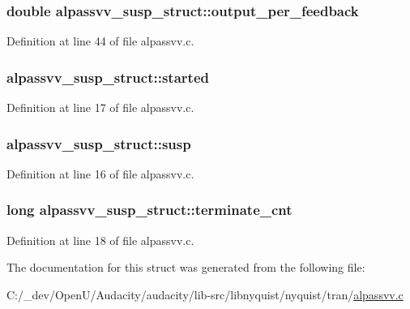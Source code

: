\subsubsection[{\texorpdfstring{output\+\_\+per\+\_\+feedback}{output_per_feedback}}]{\setlength{\rightskip}{0pt plus 5cm}double alpassvv\+\_\+susp\+\_\+struct\+::output\+\_\+per\+\_\+feedback}\hypertarget{structalpassvv__susp__struct_a5135dfdc6032b5a83537ede31a0ed58f}{}\label{structalpassvv__susp__struct_a5135dfdc6032b5a83537ede31a0ed58f}


Definition at line 44 of file alpassvv.\+c.

\subsubsection[{\texorpdfstring{started}{started}}]{ alpassvv\+\_\+susp\+\_\+struct\+::started}\hypertarget{structalpassvv__susp__struct_a42d25934c0b3fc6941bc10245a004f41}{}\label{structalpassvv__susp__struct_a42d25934c0b3fc6941bc10245a004f41}


Definition at line 17 of file alpassvv.\+c.

\subsubsection[{\texorpdfstring{susp}{susp}}]{ alpassvv\+\_\+susp\+\_\+struct\+::susp}\hypertarget{structalpassvv__susp__struct_a9f18281901c2261d76bb10a85736bce1}{}\label{structalpassvv__susp__struct_a9f18281901c2261d76bb10a85736bce1}


Definition at line 16 of file alpassvv.\+c.

\subsubsection[{\texorpdfstring{terminate\+\_\+cnt}{terminate_cnt}}]{\setlength{\rightskip}{0pt plus 5cm}long alpassvv\+\_\+susp\+\_\+struct\+::terminate\+\_\+cnt}\hypertarget{structalpassvv__susp__struct_a7e84ba094ea388783220d8f06bdaadb2}{}\label{structalpassvv__susp__struct_a7e84ba094ea388783220d8f06bdaadb2}


Definition at line 18 of file alpassvv.\+c.



The documentation for this struct was generated from the following file\+:\begin{DoxyCompactItemize}
\item 
C\+:/\+\_\+dev/\+Open\+U/\+Audacity/audacity/lib-\/src/libnyquist/nyquist/tran/\hyperlink{alpassvv_8c}{alpassvv.\+c}\end{DoxyCompactItemize}
